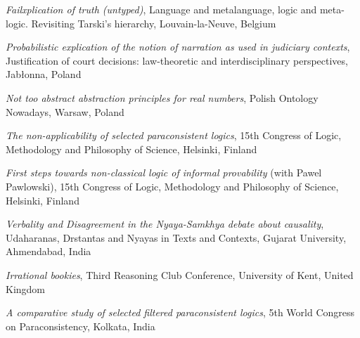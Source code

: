 \documentclass[10pt, a4paper]{article}
\newcommand{\years}[1]{\marginnote{\normalsize #1}}
\begin{document}
\emph{Failxplication of truth (untyped)}, Language and metalanguage, logic and meta-logic. Revisiting Tarski's hierarchy,  Louvain-la-Neuve, Belgium


\vspace{0.5mm}

\emph{Probabilistic explication of the notion of narration as used in judiciary contexts}, Justification of court decisions: law-theoretic and interdisciplinary perspectives,  Jab{\l}onna, Poland


\vspace{0.5mm}


\emph{Not too abstract abstraction principles for real numbers}, Polish Ontology Nowadays,  Warsaw, Poland


\vspace{0.5mm}

 \years{2015} \emph{The non-applicability of selected paraconsistent logics}, 15th Congress of Logic, Methodology and Philosophy of Science,  Helsinki, Finland



\vspace{0.5mm}

 \emph{First steps towards non-classical logic of informal provability} (with Pawel Pawlowski), 15th Congress of Logic, Methodology and Philosophy of Science,  Helsinki, Finland





\vspace{0.5mm}


\years{2014} \emph{Verbality and Disagreement in the Nyaya-Samkhya debate about causality}, Udaharanas, Drstantas and Nyayas in Texts and Contexts,  Gujarat University, Ahmendabad, India



\vspace{0.5mm}

 \emph{Irrational bookies}, Third Reasoning Club Conference, University of Kent, United Kingdom


\vspace{0.5mm}


 \emph{A comparative study of selected filtered paraconsistent logics}, 5th World Congress on Paraconsistency,  Kolkata, India
\end{document}
